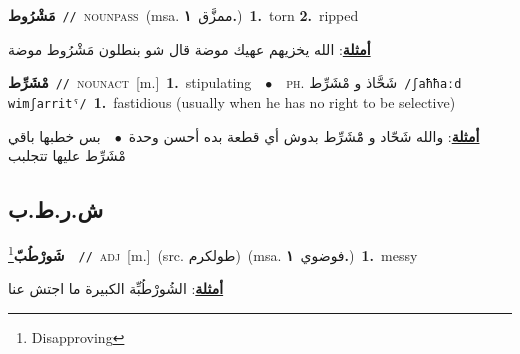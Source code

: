\documentclass[10pt,a4paper,twoside]{article} %
\begin{document}
\begin{multicols}{2}
{\setlength\topsep{0pt}\textbf{\foreignlanguage{arabic}{مَشْرُوط}}\ {\color{gray}\texttt{//}\color{black}}\ \textsc{noun\textunderscore pass}\ \color{gray}(msa. \foreignlanguage{arabic}{ممزَّق}~\foreignlanguage{arabic}{\textbf{١.}})\color{black}\ \textbf{1.}~torn  \textbf{2.}~ripped\  \begin{flushright}\color{gray}\foreignlanguage{arabic}{\textbf{\underline{\foreignlanguage{arabic}{أمثلة}}}: الله يخزيهم عهيك موضة قال شو بنطلون مَشْرُوط موضة}\end{flushright}\color{black}} \vspace{2mm}

{\setlength\topsep{0pt}\textbf{\foreignlanguage{arabic}{مْشَرِّط}}\ {\color{gray}\texttt{//}\color{black}}\ \textsc{noun\textunderscore act}\ [m.]\ \textbf{1.}~stipulating\ \ $\bullet$\ \ \textsc{ph.} \color{gray} \foreignlanguage{arabic}{شَحَّاذ و مْشَرِّط}\color{black}\ {\color{gray}\texttt{/{\sffamily ʃaħħaːd wimʃarritˤ}/}\color{black}}\ \textbf{1.}~fastidious (usually when he has no right to be selective)\  \begin{flushright}\color{gray}\foreignlanguage{arabic}{\textbf{\underline{\foreignlanguage{arabic}{أمثلة}}}: والله شَحّاد و مَْشَرِّط بدوش أي قطعة بده أحسن وحدة\ $\bullet$\ \  بس خطبها باقي مْشَرِّط عليها تتجلبب}\end{flushright}\color{black}} \vspace{2mm}

\vspace{-3mm}
\subsection*{\color{blue}\foreignlanguage{arabic}{ش.ر.ط.ب}\color{blue}{ (ntws)}} 

{\setlength\topsep{0pt}\textbf{\foreignlanguage{arabic}{شَورْطُبّ}}\footnote{Disapproving}\ \ {\color{gray}\texttt{//}\color{black}}\ \textsc{adj}\ [m.]\ (src. \color{gray}\foreignlanguage{arabic}{طولكرم}\color{black})\ \color{gray}(msa. \foreignlanguage{arabic}{فوضوي}~\foreignlanguage{arabic}{\textbf{١.}})\color{black}\ \textbf{1.}~messy\  \begin{flushright}\color{gray}\foreignlanguage{arabic}{\textbf{\underline{\foreignlanguage{arabic}{أمثلة}}}: الشُورْطُبِّة الكبيرة ما اجتش عنا}\end{flushright}\color{black}} \vspace{2mm}


\end{multicols}
\end{document}
